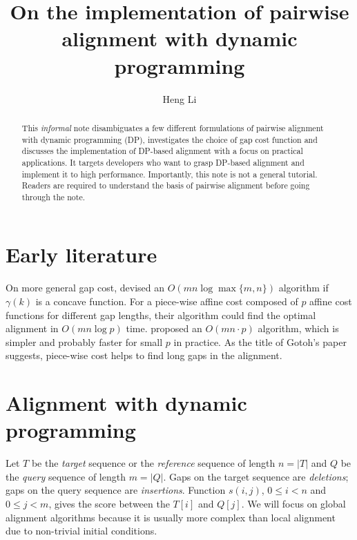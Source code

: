 \documentclass{bioinfo}
\begin{document}

\title[Alignment with DP]{On the implementation of pairwise alignment with dynamic programming}
\author[Li]{Heng Li}
\address{Broad Institute, 415 Main Street, Cambridge, MA 02142, USA}

\maketitle

\begin{abstract}
This \emph{informal} note disambiguates a few different formulations of
pairwise alignment with dynamic programming (DP), investigates the choice of
gap cost function and discusses the implementation of DP-based alignment with a
focus on practical applications. It targets developers who want to grasp
DP-based alignment and implement it to high performance. Importantly, this note
is not a general tutorial. Readers are required to understand the basis of
pairwise alignment before going through the note.
\end{abstract}

\section{Early literature}

On more general
gap cost, \citet{Miller:1988aa} devised an $O(mn\log\max\{m,n\})$ algorithm
if $\gamma(k)$ is a concave function. For a piece-wise affine cost composed of
$p$ affine cost functions for different gap lengths, their algorithm could find
the optimal alignment in $O(mn\log p)$ time. \citet{Gotoh:1990aa} proposed an
$O(mn\cdot p)$ algorithm, which is simpler and probably faster for small $p$ in
practice. As the title of Gotoh's paper suggests, piece-wise cost helps
to find long gaps in the alignment.

\section{Alignment with dynamic programming}

Let $T$ be the \emph{target} sequence or the \emph{reference} sequence of
length $n=|T|$ and $Q$ be the \emph{query} sequence of length $m=|Q|$. Gaps on
the target sequence are \emph{deletions}; gaps on the query sequence are
\emph{insertions}. Function $s(i,j)$, $0\le i<n$ and $0\le j<m$, gives the
score between the $T[i]$ and $Q[j]$. We will focus on global alignment
algorithms because it is usually more complex than local alignment due to
non-trivial initial conditions.
\end{document}
